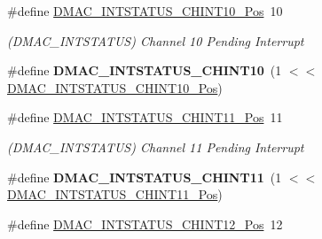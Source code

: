 \begin{DoxyCompactItemize}
\item 
\hypertarget{group___s_a_m_l21___d_m_a_c_ga11180a096aa7c0fd160c9764ae6d4527}{}\#define \hyperlink{group___s_a_m_l21___d_m_a_c_ga11180a096aa7c0fd160c9764ae6d4527}{D\+M\+A\+C\+\_\+\+I\+N\+T\+S\+T\+A\+T\+U\+S\+\_\+\+C\+H\+I\+N\+T10\+\_\+\+Pos}~10\label{group___s_a_m_l21___d_m_a_c_ga11180a096aa7c0fd160c9764ae6d4527}

\begin{DoxyCompactList}\small\item\em (D\+M\+A\+C\+\_\+\+I\+N\+T\+S\+T\+A\+T\+U\+S) Channel 10 Pending Interrupt \end{DoxyCompactList}\item 
\hypertarget{group___s_a_m_l21___d_m_a_c_ga0157ec3373830d44e57192357264a11a}{}\#define {\bfseries D\+M\+A\+C\+\_\+\+I\+N\+T\+S\+T\+A\+T\+U\+S\+\_\+\+C\+H\+I\+N\+T10}~(1 $<$$<$ \hyperlink{group___s_a_m_l21___d_m_a_c_ga11180a096aa7c0fd160c9764ae6d4527}{D\+M\+A\+C\+\_\+\+I\+N\+T\+S\+T\+A\+T\+U\+S\+\_\+\+C\+H\+I\+N\+T10\+\_\+\+Pos})\label{group___s_a_m_l21___d_m_a_c_ga0157ec3373830d44e57192357264a11a}

\item 
\hypertarget{group___s_a_m_l21___d_m_a_c_ga48621d34d3b11007dd010bfcc2bd0d70}{}\#define \hyperlink{group___s_a_m_l21___d_m_a_c_ga48621d34d3b11007dd010bfcc2bd0d70}{D\+M\+A\+C\+\_\+\+I\+N\+T\+S\+T\+A\+T\+U\+S\+\_\+\+C\+H\+I\+N\+T11\+\_\+\+Pos}~11\label{group___s_a_m_l21___d_m_a_c_ga48621d34d3b11007dd010bfcc2bd0d70}

\begin{DoxyCompactList}\small\item\em (D\+M\+A\+C\+\_\+\+I\+N\+T\+S\+T\+A\+T\+U\+S) Channel 11 Pending Interrupt \end{DoxyCompactList}\item 
\hypertarget{group___s_a_m_l21___d_m_a_c_gac8d93ca60cea66d9c67064d2df0e4349}{}\#define {\bfseries D\+M\+A\+C\+\_\+\+I\+N\+T\+S\+T\+A\+T\+U\+S\+\_\+\+C\+H\+I\+N\+T11}~(1 $<$$<$ \hyperlink{group___s_a_m_l21___d_m_a_c_ga48621d34d3b11007dd010bfcc2bd0d70}{D\+M\+A\+C\+\_\+\+I\+N\+T\+S\+T\+A\+T\+U\+S\+\_\+\+C\+H\+I\+N\+T11\+\_\+\+Pos})\label{group___s_a_m_l21___d_m_a_c_gac8d93ca60cea66d9c67064d2df0e4349}

\item 
\hypertarget{group___s_a_m_l21___d_m_a_c_ga9d3e098b21d6c709a09abefdd697bed7}{}\#define \hyperlink{group___s_a_m_l21___d_m_a_c_ga9d3e098b21d6c709a09abefdd697bed7}{D\+M\+A\+C\+\_\+\+I\+N\+T\+S\+T\+A\+T\+U\+S\+\_\+\+C\+H\+I\+N\+T12\+\_\+\+Pos}~12\label{group___s_a_m_l21___d_m_a_c_ga9d3e098b21d6c709a09abefdd697bed7}


\end{DoxyCompactItemize}
